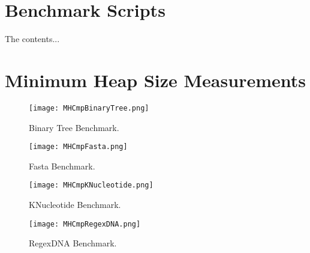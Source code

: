 \documentclass{l4proj}
\begin{document}
\begin{appendices}
\chapter{Benchmark Scripts}
The contents...
\chapter{Minimum Heap Size Measurements}
\label{minheapsize}
\begin{figure}[!ht]
  \centering
    \texttt{[image: MHCmpBinaryTree.png]}
    \caption{Binary Tree Benchmark.}
\end{figure}

\begin{figure}[!ht]
  \centering
    \texttt{[image: MHCmpFasta.png]}
    \caption{Fasta Benchmark.}
\end{figure}

\begin{figure}[!ht]
  \centering
    \texttt{[image: MHCmpKNucleotide.png]}
    \caption{KNucleotide Benchmark.}
\end{figure}

\begin{figure}[!ht]
  \centering
    \texttt{[image: MHCmpRegexDNA.png]}
    \caption{RegexDNA Benchmark.}
\end{figure}

\end{appendices}
\end{document}
